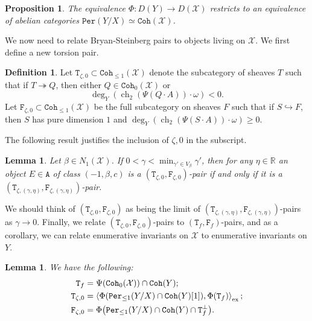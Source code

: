 \documentclass[leqno, openany]{memoir}
\newtheorem{prop}[thm]{Proposition}
\newtheorem{lem}[thm]{Lemma}
\theoremstyle{definition}
\newtheorem{defn}[thm]{Definition}
\theoremstyle{remark}
\theoremstyle{plain}
\theoremstyle{definition}
\theoremstyle{remark}
\newcommand{\R}{\mathbb{R}}
\newcommand{\mc}[1]{\mathcal{#1}}
\newcommand{\mr}[1]{\mathrm{#1}}
\newcommand{\mt}[1]{\mathtt{#1}}
\newcommand{\on}[1]{\operatorname{#1}}
\begin{document}
\begin{prop}
    The equivalence $\Phi \colon D(Y) \to D(\mc{X})$ restricts to an equivalence of abelian categories $\mt{Per}(Y/X) \simeq \mt{Coh}(\mc{X})$.
\end{prop}

We now need to relate Bryan-Steinberg pairs to objects living on $\mc{X}$. We first define a new torsion pair.

\begin{defn}
    Let $\mt{T}_{\zeta, 0} \subset \mt{Coh}_{\leq 1}(\mc{X})$ denote the subcategory of sheaves $T$ such that if $T \twoheadrightarrow Q$, then either $Q \in \mt{Coh}_0(\mc{X})$ or 
    \[ \deg_Y(\on{ch}_2(\Psi(Q \cdot A)) \cdot \omega) < 0. \]
    Let $\mt{F}_{\zeta, 0} \subset \mt{Coh}_{\leq 1}(\mc{X})$ be the full subcategory on sheaves $F$ such that if $S \hookrightarrow F$, then $S$ has pure dimension $1$ and $\deg_Y(\on{ch}_2(\Psi(S \cdot A)) \cdot \omega) \geq 0$.
\end{defn}

The following result justifies the inclusion of $\zeta, 0$ in the subscript.
\begin{lem}
    Let $\beta \in N_1(\mc{X})$. If $0 < \gamma < \min_{\gamma'\in V_{\beta}} \gamma'$, then for any $\eta \in \R$ an object $E \in \mt{A}$ of class $(-1, \beta, c)$ is a $(\mt{T}_{\zeta, 0}, \mt{F}_{\zeta, 0})$-pair if and only if it is a $(\mt{T}_{\zeta, (\gamma, \eta)}, \mt{F}_{\zeta, (\gamma, \eta)})$-pair.
\end{lem}

We should think of $(\mt{T}_{\zeta, 0}, \mt{F}_{\zeta, 0})$ as being the limit of $(\mt{T}_{\zeta, (\gamma, \eta)}, \mt{F}_{\zeta, (\gamma, \eta)})$-pairs as $\gamma \to 0$. Finally, we relate $(\mt{T}_{\zeta, 0}, \mt{F}_{\zeta, 0})$-pairs to $(\mt{T}_f, \mt{F}_f)$-pairs, and as a corollary, we can relate enumerative invariants on $\mc{X}$ to enumerative invariants on $Y$.

\begin{lem}
    We have the following:
    \begin{align*}
        \mt{T}_f &= \Psi(\mt{Coh}_0(\mc{X})) \cap \mt{Coh}(Y); \\
        \mt{T}_{\zeta, 0} &= \ev{\Phi(\mt{Per}_{\leq 1}(Y/X) \cap \mt{Coh}(Y)[1]), \Phi(\mt{T}_f)}_{\mr{ex}}; \\
        \mt{F}_{\zeta, 0} &= \Phi\qty(\mt{Per}_{\leq 1}(Y/X) \cap \mt{Coh}(Y) \cap \mt{T}_f^{\perp}).
    \end{align*}
\end{lem}
\end{document}

